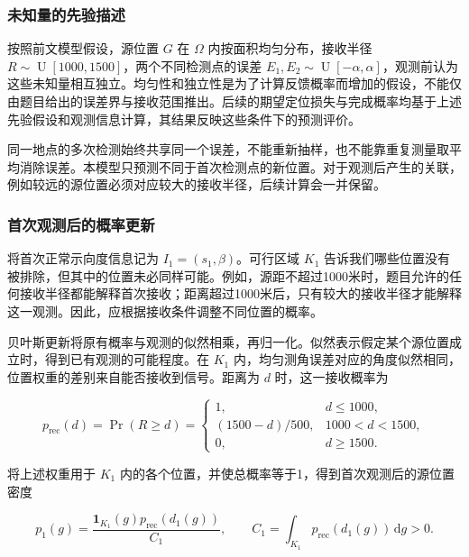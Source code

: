 \subsubsection{未知量的先验描述}

按照前文模型假设，源位置 \(G\) 在 \(\Omega\) 内按面积均匀分布，接收半径 \(R\sim\operatorname{U}[1000,1500]\)，两个不同检测点的误差 \(E_1,E_2\sim\operatorname{U}[-\alpha,\alpha]\)，观测前认为这些未知量相互独立。均匀性和独立性是为了计算反馈概率而增加的假设，不能仅由题目给出的误差界与接收范围推出。后续的期望定位损失与完成概率均基于上述先验假设和观测信息计算，其结果反映这些条件下的预测评价。

同一地点的多次检测始终共享同一个误差，不能重新抽样，也不能靠重复测量取平均消除误差。本模型只预测不同于首次检测点的新位置。对于观测后产生的关联，例如较远的源位置必须对应较大的接收半径，后续计算会一并保留。

\subsubsection{首次观测后的概率更新}

将首次正常示向度信息记为 \(I_1=(s_1,\beta)\)。可行区域 \(K_1\) 告诉我们哪些位置没有被排除，但其中的位置未必同样可能。例如，源距不超过1000米时，题目允许的任何接收半径都能解释首次接收；距离超过1000米后，只有较大的接收半径才能解释这一观测。因此，应根据接收条件调整不同位置的概率。

贝叶斯更新将原有概率与观测的似然相乘，再归一化。似然表示假定某个源位置成立时，得到已有观测的可能程度。在 \(K_1\) 内，均匀测角误差对应的角度似然相同，位置权重的差别来自能否接收到信号。距离为 \(d\) 时，这一接收概率为

\begin{equation}
 p_{\mathrm{rec}}(d)=\Pr(R\ge d)=
 \begin{cases}
 1,&d\le1000,\\
 (1500-d)/500,&1000<d<1500,\\
 0,&d\ge1500.
 \end{cases}
\label{eq:q2-pair-weight}
\end{equation}

将上述权重用于 \(K_1\) 内的各个位置，并使总概率等于1，得到首次观测后的源位置密度

\begin{equation}
 p_1(g)=\frac{\mathbf1_{K_1}(g)p_{\mathrm{rec}}(d_1(g))}{C_1},
 \qquad C_1=\int_{K_1}p_{\mathrm{rec}}(d_1(g))\,\mathrm dg>0.
\label{eq:q2-pair-posterior}
\end{equation}

